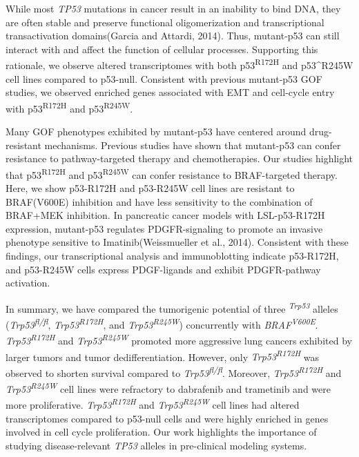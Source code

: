 While most \emph{TP53} mutations in cancer result in an inability to bind DNA, they are often stable and preserve functional oligomerization and transcriptional transactivation domains(Garcia and Attardi, 2014). Thus, mutant-p53 can still interact with and affect the function of cellular processes. Supporting this rationale, we observe altered transcriptomes with both p53\textsuperscript{R172H} and p53\^{}R245W cell lines compared to p53-null. Consistent with previous mutant-p53 GOF studies, we observed enriched genes associated with EMT and cell-cycle entry with p53\textsuperscript{R172H} and p53\textsuperscript{R245W}.

Many GOF phenotypes exhibited by mutant-p53 have centered around drug-resistant mechanisms. Previous studies have shown that mutant-p53 can confer resistance to pathway-targeted therapy and chemotherapies. Our studies highlight that p53\textsuperscript{R172H} and p53\textsuperscript{R245W} can confer resistance to BRAF-targeted therapy. Here, we show p53-R172H and p53-R245W cell lines are resistant to BRAF(V600E) inhibition and have less sensitivity to the combination of BRAF+MEK inhibition. In pancreatic cancer models with LSL-p53-R172H expression, mutant-p53 regulates PDGFR-signaling to promote an invasive phenotype sensitive to Imatinib(Weissmueller et al., 2014). Consistent with these findings, our transcriptional analysis and immunoblotting indicate p53-R172H, and p53-R245W cells express PDGF-ligands and exhibit PDGFR-pathway activation.

In summary, we have compared the tumorigenic potential of three \emph{\textsuperscript{Trp53}} alleles (\emph{Trp53\textsuperscript{fl/fl}}, \emph{Trp53\textsuperscript{R172H}}, and \emph{Trp53\textsuperscript{R245W}}) concurrently with \emph{BRAF\textsuperscript{V600E}}. \emph{Trp53\textsuperscript{R172H}} and \emph{Trp53\textsuperscript{R245W}} promoted more aggressive lung cancers exhibited by larger tumors and tumor dedifferentiation. However, only \emph{Trp53\textsuperscript{R172H}} was observed to shorten survival compared to \emph{Trp53\textsuperscript{fl/fl}}. Moreover, \emph{Trp53\textsuperscript{R172H}} and \emph{Trp53\textsuperscript{R245W}} cell lines were refractory to dabrafenib and trametinib and were more proliferative. \emph{Trp53\textsuperscript{R172H}} and \emph{Trp53\textsuperscript{R245W}} cell lines had altered transcriptomes compared to p53-null cells and were highly enriched in genes involved in cell cycle proliferation. Our work highlights the importance of studying disease-relevant \emph{TP53} alleles in pre-clinical modeling systems.

